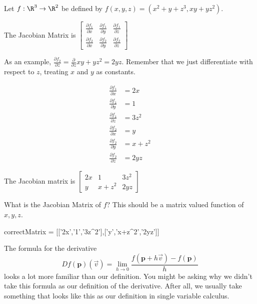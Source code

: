 \documentclass{ximera}
\begin{document}
	\begin{question}
		Let $f:\R^3 \to \R^2$ be defined by $f(x,y,z) = (x^2+y+z^3,xy+yz^2)$.  
		\begin{solution}
		\begin{hint}
				The Jacobian Matrix is \(\begin{bmatrix} \frac{\partial f_1}{\partial x} & \frac{\partial f_1}{\partial y} & \frac{\partial f_1}{\partial z} \\
																				\frac{\partial f_2}{\partial x} & \frac{\partial f_2}{\partial y} & \frac{\partial f_2}{\partial z}\end{bmatrix}\)
		\end{hint}
		\begin{hint}
			As an example, $\frac{\partial f_2}{\partial z}= \frac{\partial}{\partial z} xy+yz^2 = 2yz$.  Remember that we 
			just differentiate with respect to $z$, treating $x$ and $y$ as constants. 
		\end{hint}
		\begin{hint}
			\begin{align*}
				\frac{\partial f_1}{\partial x} &=  2x\\ 
				\frac{\partial f_1}{\partial y} &= 1\\ 
				\frac{\partial f_1}{\partial z} &= 3z^2\\ 
				\frac{\partial f_2}{\partial x} &= y\\ 
				\frac{\partial f_2}{\partial y} &= x+z^2\\ 
				\frac{\partial f_2}{\partial z} &= 2yz
			\end{align*}
		\end{hint}
		\begin{hint}
			The Jacobian matrix is \(
			\begin{bmatrix}
				2x & 1 & 3z^2\\
				y&x+z^2 & 2yz
			\end{bmatrix}
			\)
		\end{hint}
		What is the Jacobian Matrix of $f$?  This should be a matrix valued function of $x,y,z$.
		\begin{matrix-answer}[name=M]
			correctMatrix = [['2x','1','3z^2'],['y','x+z^2','2yz']]
		\end{matrix-answer}
		\end{solution}
	\end{question}
		
   The formula for the derivative
   \[
   Df(\mathbf{p})(\vec{v}) = \displaystyle\lim_{h \to 0} \frac{f(\mathbf{p}+h\vec{v})-f(\mathbf{p})}{h}
   \]
   looks a lot more familiar
   than our definition. You might be asking why we didn't take this formula as our definition of the derivative.  After all, we usually take something that looks like 
	this as our definition in single variable calculus.
	
\end{document}
